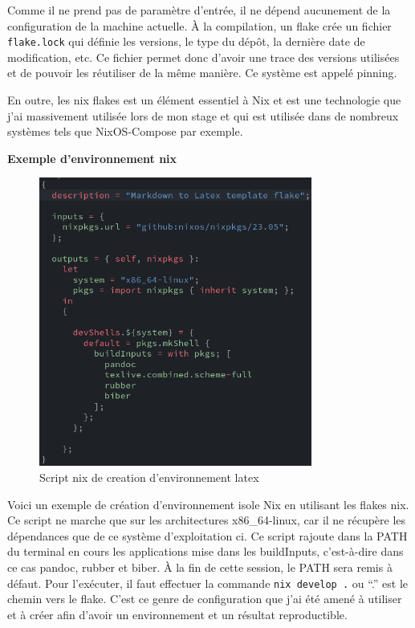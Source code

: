 \documentclass[a4paper,french,12pt, titlepage]{article}
\begin{document}
Comme il ne prend pas de paramètre d'entrée, il ne dépend aucunement de
la configuration de la machine actuelle. À la compilation, un flake crée
un fichier \texttt{flake.lock} qui définie les versions, le type du
dépôt, la dernière date de modification, etc. Ce fichier permet donc
d'avoir une trace des versions utilisées et de pouvoir les réutiliser de
la même manière. Ce système est appelé \gls{pinning}.\newline

En outre, les nix flakes est un élément essentiel à Nix et est une
technologie que j'ai massivement utilisée lors de mon stage et qui est
utilisée dans de nombreux systèmes tels que NixOS-Compose par
exemple.\newline

\textbf{Exemple d'environnement nix}\newline

\begin{figure}[h]
\centering
\includegraphics[width=0.8\textwidth,height=0.8\textheight,keepaspectratio]{images/flakebasenix.png}
\caption{Script nix de creation d'environnement latex}
\end{figure}

Voici un exemple de création d'environnement isole Nix en utilisant les
flakes nix. Ce script ne marche que sur les architectures x86\_64-linux,
car il ne récupère les dépendances que de ce système d'exploitation ci.
Ce script rajoute dans la PATH du terminal en cours les applications
mise dans les buildInputs, c'est-à-dire dans ce cas pandoc, rubber et
biber. À la fin de cette session, le PATH sera remis à défaut. Pour
l'exécuter, il faut effectuer la commande \texttt{nix\ develop\ .} ou
``.'' est le chemin vers le flake. C'est ce genre de configuration que
j'ai été amené à utiliser et à créer afin d'avoir un environnement et un
résultat reproductible.\newline
\end{document}
